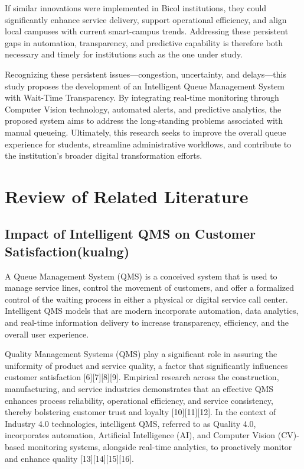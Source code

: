 \documentclass{research}
\begin{document}
If similar innovations were implemented in Bicol institutions, they could significantly enhance service delivery, support operational efficiency, and align local campuses with current smart-campus trends. Addressing these persistent gaps in automation, transparency, and predictive capability is therefore both necessary and timely for institutions such as the one under study.

Recognizing these persistent issues—congestion, uncertainty, and delays—this study proposes the development of an Intelligent Queue Management System with Wait-Time Transparency. By integrating real-time monitoring through Computer Vision technology, automated alerts, and predictive analytics, the proposed system aims to address the long-standing problems associated with manual queueing. Ultimately, this research seeks to improve the overall queue experience for students, streamline administrative workflows, and contribute to the institution's broader digital transformation efforts.

\section{Review of Related Literature}

\subsection*{ Impact of Intelligent QMS on Customer Satisfaction(kualng) }

A Queue Management System (QMS) is a conceived system that is used to manage service lines, control the movement of customers, and offer a formalized control of the waiting process in either a physical or digital service call center. Intelligent QMS models that are modern incorporate automation, data analytics, and real-time information delivery to increase transparency, efficiency, and the overall user experience. 

Quality Management Systems (QMS) play a significant role in assuring the uniformity of product and service quality, a factor that significantly influences customer satisfaction [6][7][8][9]. Empirical research across the construction, manufacturing, and service industries demonstrates that an effective QMS enhances process reliability, operational efficiency, and service consistency, thereby bolstering customer trust and loyalty [10][11][12]. In the context of Industry 4.0 technologies, intelligent QMS, referred to as Quality 4.0, incorporates automation, Artificial Intelligence (AI), and Computer Vision (CV)-based monitoring systems, alongside real-time analytics, to proactively monitor and enhance quality [13][14][15][16]. 
\end{document}
